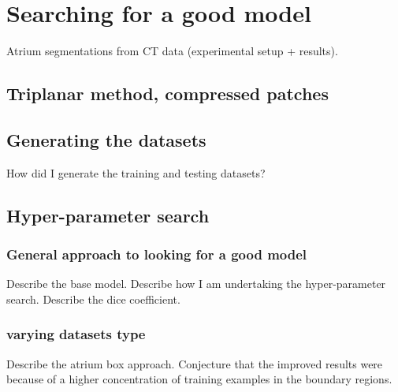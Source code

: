 \chapter{Searching for a good model}

Atrium segmentations from CT data (experimental setup + results).

\section{Triplanar method, compressed patches}

\section{Generating the datasets}

How did I generate the training and testing datasets?

\section{Hyper-parameter search}

\subsection{General approach to looking for a good model}

Describe the base model. Describe how I am undertaking the hyper-parameter search. Describe the dice coefficient.

\subsection{varying datasets type}

Describe the atrium box approach. Conjecture that the improved results were because of a higher concentration of training examples in the boundary regions.

